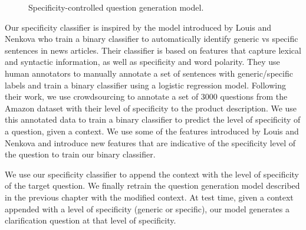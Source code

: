 \documentclass[11pt,a4paper]{article}
\begin{document}
\begin{figure}[t]
    \caption{Specificity-controlled question generation model.}\label{fig:style_clarification_roadmap}
\end{figure}

Our specificity classifier is inspired by the model introduced by Louis and Nenkova \cite{louis2011automatic} who train a binary classifier to automatically identify generic vs specific sentences in news articles. 
Their classifier is based on features that capture lexical and syntactic information, as well as specificity and word polarity. 
They use human annotators to manually annotate a set of sentences with generic/specific labels and train a binary classifier using a logistic regression model. 
Following their work, we use crowdsourcing to annotate a set of 3000 questions from the Amazon dataset with their level of specificity to the product description. 
We use this annotated data to train a binary classifier to predict the level of specificity of a question, given a context. 
We use some of the features introduced by Louis and Nenkova \cite{louis2011automatic} and introduce new features that are indicative of the specificity level of the question to train our binary classifier.

We use our specificity classifier to append the context with the level of specificity of the target question. 
We finally retrain the question generation model described in the previous chapter with the modified context. 
At test time, given a context appended with a level of specificity (generic or specific), our model generates a clarification question at that level of specificity. 
\end{document}
